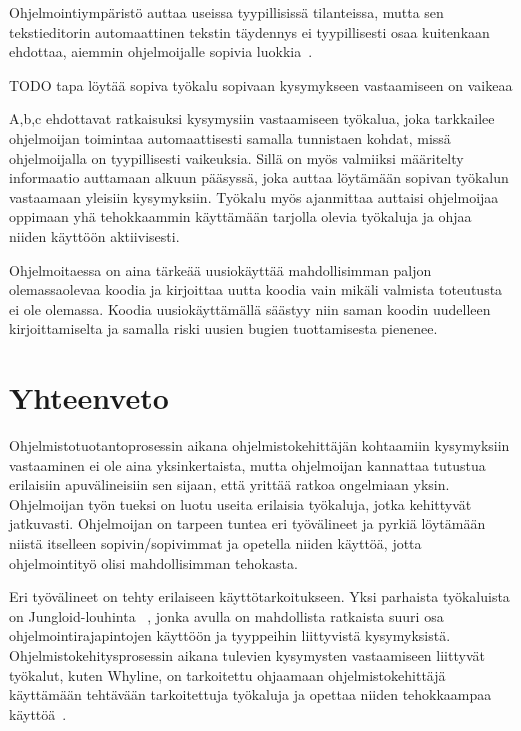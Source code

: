 \documentclass[finnish]{tktltiki2}
\theoremstyle{definition}
\theoremstyle{remark}
\begin{document}
Ohjelmointiympäristö auttaa useissa tyypillisissä tilanteissa, mutta sen tekstieditorin automaattinen tekstin täydennys ei tyypillisesti osaa kuitenkaan ehdottaa, aiemmin ohjelmoijalle sopivia luokkia~\cite{jungloid-mining}.

TODO tapa löytää sopiva työkalu sopivaan kysymykseen vastaamiseen on vaikeaa \cite{programmers-coach}

A,b,c ehdottavat ratkaisuksi kysymysiin vastaamiseen työkalua, joka tarkkailee ohjelmoijan toimintaa automaattisesti samalla tunnistaen kohdat, missä ohjelmoijalla on tyypillisesti vaikeuksia. Sillä on myös valmiiksi määritelty informaatio auttamaan alkuun pääsyssä, joka auttaa löytämään sopivan työkalun vastaamaan yleisiin kysymyksiin. Työkalu myös ajanmittaa auttaisi ohjelmoijaa oppimaan yhä tehokkaammin käyttämään tarjolla olevia työkaluja ja ohjaa niiden käyttöön aktiivisesti.
\cite{programmers-coach}

Ohjelmoitaessa on aina tärkeää uusiokäyttää mahdollisimman paljon olemassaolevaa koodia ja kirjoittaa uutta koodia vain mikäli valmista toteutusta ei ole olemassa. Koodia uusiokäyttämällä säästyy niin saman koodin uudelleen kirjoittamiselta ja samalla riski uusien bugien tuottamisesta pienenee.


\section{Yhteenveto}
Ohjelmistotuotantoprosessin aikana ohjelmistokehittäjän kohtaamiin kysymyksiin vastaaminen ei ole aina yksinkertaista, mutta ohjelmoijan kannattaa tutustua erilaisiin apuvälineisiin sen sijaan, että yrittää ratkoa ongelmiaan yksin.
Ohjelmoijan työn tueksi on luotu useita erilaisia työkaluja, jotka kehittyvät jatkuvasti. Ohjelmoijan on tarpeen tuntea eri työvälineet ja pyrkiä löytämään niistä itselleen sopivin/sopivimmat ja opetella niiden käyttöä, jotta ohjelmointityö olisi mahdollisimman tehokasta.

Eri työvälineet on tehty erilaiseen käyttötarkoitukseen. Yksi parhaista työkaluista on Jungloid-louhinta~\cite{jungloid-mining}
, jonka avulla on mahdollista ratkaista suuri osa ohjelmointirajapintojen käyttöön ja tyyppeihin liittyvistä
kysymyksistä. Ohjelmistokehitysprosessin aikana tulevien kysymysten vastaamiseen liittyvät työkalut, kuten Whyline, on tarkoitettu ohjaamaan ohjelmistokehittäjä käyttämään tehtävään tarkoitettuja työkaluja ja opettaa niiden tehokkaampaa käyttöä~\cite{whyline}.




\end{document}
